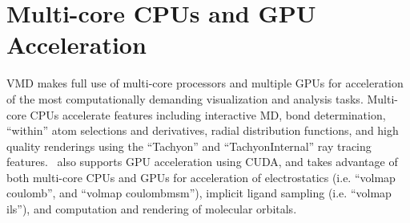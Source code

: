 \section{Multi-core CPUs and GPU Acceleration}
VMD makes full use of multi-core processors and multiple GPUs for 
acceleration of the most computationally demanding visualization 
and analysis tasks.  Multi-core CPUs accelerate features including
interactive MD, bond determination, ``within'' atom selections 
and derivatives, radial distribution functions, and high quality
renderings using the ``Tachyon'' and ``TachyonInternal'' ray tracing 
features.  \VMD\ also supports GPU acceleration using CUDA, and takes 
advantage of both multi-core CPUs and GPUs for acceleration of 
electrostatics (i.e. ``volmap coulomb'', and ``volmap coulombmsm''), 
implicit ligand sampling (i.e. ``volmap ils''), and 
computation and rendering of molecular orbitals.


